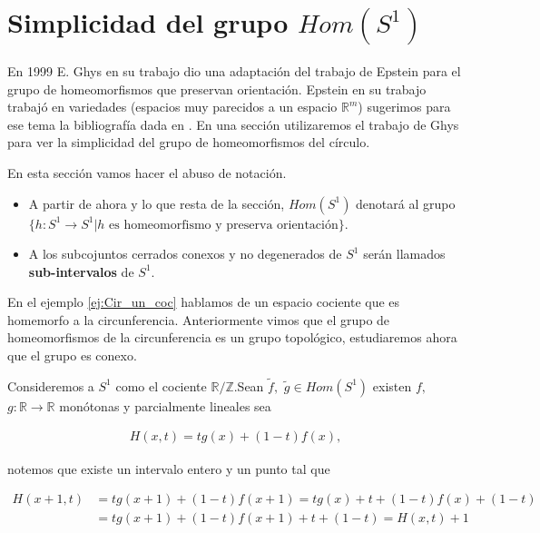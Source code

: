 




	
\section*{Simplicidad del grupo $Hom(S^1)$}

 En 1999 E. Ghys en su trabajo \cite{ghys} dio una adaptación del trabajo de Epstein \cite{epst} para el grupo de homeomorfismos que preservan orientación. Epstein en su trabajo \cite{epst} trabajó en variedades (espacios muy parecidos a un espacio $\mathbb{R}^m$) sugerimos para ese tema la bibliografía dada en \cite{palmas}. En una sección utilizaremos el trabajo de Ghys para ver la simplicidad del grupo de homeomorfismos del círculo.
 
\begin{cn}
En esta sección vamos hacer el abuso de notación.
	\begin{itemize}
	\item A partir de ahora y lo que resta de la sección, $Hom(S^1)$ denotará al grupo $\{h: S^1 \to S^1 | h \text{ es homeomorfismo y preserva orientación} \}$.
	\item A los subcojuntos cerrados conexos y no degenerados de  $S^1$ serán llamados \textbf{sub-intervalos} de $S^1.$
	\end{itemize}
\end{cn}
 
  En el ejemplo \ref{ej:Cir_un_coc} hablamos de un espacio cociente que es homemorfo a la circunferencia. Anteriormente vimos que el grupo de homeomorfismos de la circunferencia es un grupo topológico, estudiaremos ahora que el grupo es conexo.
  
  Consideremos a $S^1$ como el cociente $\mathbb{R} / \mathbb{Z}$.Sean $\tilde{f},$ $\tilde{g} \in Hom(S^1)$ existen $f,$ $g: \mathbb{R} \to \mathbb{R}$ monótonas y parcialmente lineales sea 

\begin{align*}
H(x,t)=tg(x)+(1-t)f(x),
\end{align*}

notemos que existe un intervalo entero y un punto tal que 

\begin{align*}
H(x+1,t) & = tg(x+1)+(1-t)f(x+1)= tg(x)+t+(1-t)f(x)+(1-t) \\
& = tg(x+1)+(1-t)f(x+1) + t +(1-t)= H(x,t)+1
\end{align*} 

